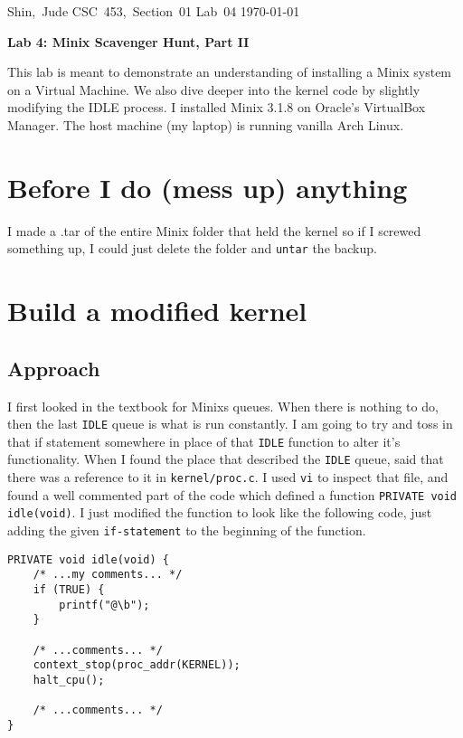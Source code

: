 \documentclass[11pt]{article}
\begin{document}
\hfill\vbox{\hbox{Shin, Jude}
		\hbox{CSC 453, Section 01}	
		\hbox{Lab 04}	
		\hbox{\today}}\par

\bigskip
\centerline{\Large\bf Lab 4: {\sc Minix} Scavenger Hunt, Part II}\par
\bigskip

This lab is meant to demonstrate an understanding of installing a {\sc Minix} system on a Virtual Machine. We also dive deeper into the kernel code by slightly modifying the IDLE process. I installed {\sc Minix 3.1.8} on Oracle's {\sc VirtualBox Manager}. The host machine (my laptop) is running vanilla {\sc Arch Linux}.

\setcounter{section}{0}
\section{Before I do (mess up) anything}
I made a .tar of the entire {\sc Minix} folder that held the kernel so if I screwed something up, I could just delete the folder and {\tt untar} the backup.

\section{Build a modified kernel}
\subsection{Approach}
I first looked in the textbook for {\sc Minix}s queues. When there is nothing to do, then the last {\tt IDLE} queue is what is run constantly. I am going to try and toss in that if statement somewhere in place of that {\tt IDLE} function to alter it's functionality. When I found the place that described the {\tt IDLE} queue, said that there was a reference to it in {\tt kernel/proc.c}. I used {\tt vi} to inspect that file, and found a well commented part of the code which defined a function {\tt PRIVATE void idle(void)}. 
I just modified the function to look like the following code, just adding the given {\tt if-statement} to the beginning of the function.

\begin{verbatim}
PRIVATE void idle(void) {
	/* ...my comments... */
	if (TRUE) {
		printf("@\b");
	}

	/* ...comments... */
	context_stop(proc_addr(KERNEL));
	halt_cpu();

	/* ...comments... */
}
\end{verbatim}
\end{document}

